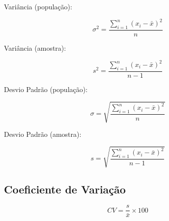 \documentclass[
	12pt,
	a4paper
]{article}
\begin{document}
Variância (população):

\[ \sigma^2=\frac{\sum_{i=1}^{n} (x_i - \bar{x})^2}{n} \]

Variância (amostra):

\[ s^2=\frac{\sum_{i=1}^{n} (x_i - \bar{x})^2}{n-1} \]

Desvio Padrão (população):

\[ \sigma=\sqrt{\frac{\sum_{i=1}^{n} (x_i - \bar{x})^2}{n}} \]

Desvio Padrão (amostra):

\[ s=\sqrt{\frac{\sum_{i=1}^{n} (x_i - \bar{x})^2}{n-1}} \]

\subsection{Coeficiente de Variação}

\[ CV=\frac{s}{\bar{x}} \times 100 \]
\end{document}
